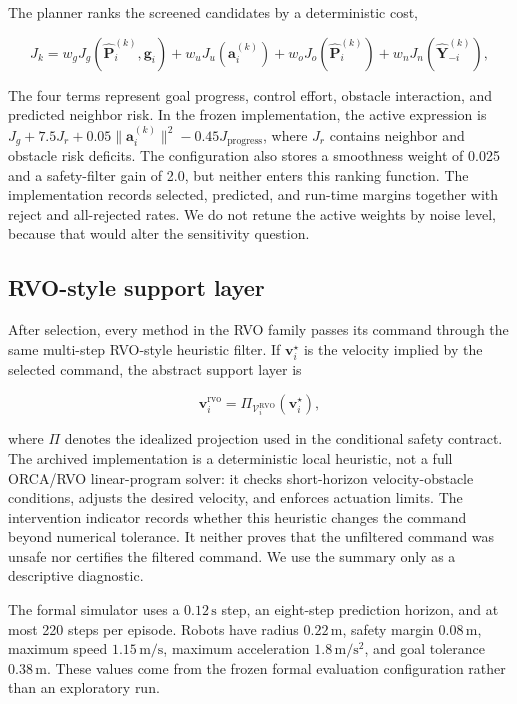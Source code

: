 \documentclass[pdflatex,sn-mathphys-num]{sn-jnl}
\begin{document}
The planner ranks the screened candidates by a deterministic cost,

\begin{equation}
J_k=w_g J_g(\widehat{\mathbf{P}}_i^{(k)},\mathbf{g}_i)+w_u J_u(\mathbf{a}_i^{(k)})+w_o J_o(\widehat{\mathbf{P}}_i^{(k)})+w_n J_n(\widehat{\mathbf{Y}}_{-i}^{(k)}),
\label{eq:cost}
\end{equation}

The four terms represent goal progress, control effort, obstacle interaction, and predicted neighbor risk. In the frozen implementation, the active expression is $J_g+7.5J_r+0.05\lVert\mathbf{a}_i^{(k)}\rVert^2-0.45J_{\mathrm{progress}}$, where $J_r$ contains neighbor and obstacle risk deficits. The configuration also stores a smoothness weight of 0.025 and a safety-filter gain of 2.0, but neither enters this ranking function. The implementation records selected, predicted, and run-time margins together with reject and all-rejected rates. We do not retune the active weights by noise level, because that would alter the sensitivity question.

\subsection{RVO-style support layer}

After selection, every method in the RVO family passes its command through the same multi-step RVO-style heuristic filter. If $\mathbf{v}_i^\star$ is the velocity implied by the selected command, the abstract support layer is

\begin{equation}
\mathbf{v}_i^{\mathrm{rvo}}=\Pi_{\mathcal{V}_i^{\mathrm{RVO}}}(\mathbf{v}_i^\star),
\label{eq:rvo}
\end{equation}

where $\Pi$ denotes the idealized projection used in the conditional safety contract. The archived implementation is a deterministic local heuristic, not a full ORCA/RVO linear-program solver: it checks short-horizon velocity-obstacle conditions, adjusts the desired velocity, and enforces actuation limits. The intervention indicator records whether this heuristic changes the command beyond numerical tolerance. It neither proves that the unfiltered command was unsafe nor certifies the filtered command. We use the summary only as a descriptive diagnostic.

The formal simulator uses a $0.12\,\mathrm{s}$ step, an eight-step prediction horizon, and at most 220 steps per episode. Robots have radius $0.22\,\mathrm{m}$, safety margin $0.08\,\mathrm{m}$, maximum speed $1.15\,\mathrm{m/s}$, maximum acceleration $1.8\,\mathrm{m/s^2}$, and goal tolerance $0.38\,\mathrm{m}$. These values come from the frozen formal evaluation configuration rather than an exploratory run.
\end{document}
